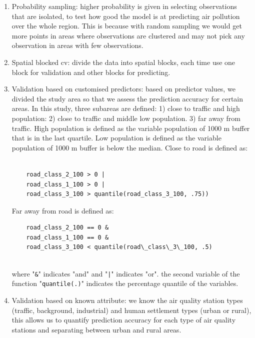 \documentclass{article}
\begin{document}
\begin{itemize}
\begin{enumerate}
    \item Probability sampling: higher probability is given in selecting observations that are isolated, to test how good the model is at predicting air pollution over the whole region. This is because with random sampling we would get more points in areas where observations are clustered and may not pick any observation in areas with few observations.   
    \item Spatial blocked cv: divide the data into spatial blocks, each time use one block for validation and other blocks for predicting. 
    \item Validation based on customised predictors: based on predictor values, we divided the study area so that we assess the prediction accuracy for certain areas. In this study, three subareas are defined:  1) close to traffic and high population:  
    2) close to traffic and middle low population. 3) far away from traffic. High population is defined as the variable population of 1000 m buffer that is in the last quartile. Low population is defined as the variable population of 1000 m buffer is below the median. Close to road is defined as: 
    \begin{lstlisting} 
    
    road_class_2_100 > 0 | 
    road_class_1_100 > 0 |
    road_class_3_100 > quantile(road_class_3_100, .75)) \end{lstlisting}
    Far away from road is defined as:
  \begin{lstlisting} 
    road_class_2_100 == 0 &
    road_class_1_100 == 0 & 
    road_class_3_100 < quantile(road\_class\_3\_100, .5)
    
    \end{lstlisting}
    where "{\tt \&}" indicates "and" and "{\tt |}" indicates "or". the second variable of the function "{\tt quantile(.)}" indicates the percentage quantile of the variables. 
   
    \item Validation based on known attribute: we know the air quality station types (traffic, background, industrial) and human settlement types (urban or rural), this allows us to quantify prediction accuracy for each type of air quality stations and separating between urban and rural areas. 
\end{enumerate}



\end{itemize}
 
\end{document}
